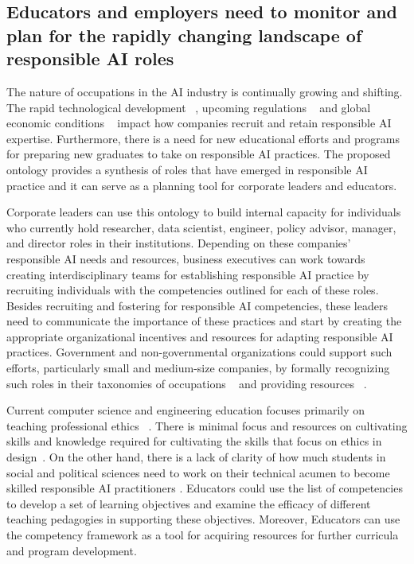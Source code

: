 \documentclass[sigconf]{acmart}
\begin{document}
\subsection{Educators and employers need to monitor and plan for the rapidly changing landscape of responsible AI roles}

The nature of occupations in the AI industry is continually growing and shifting. The rapid technological development ~\cite{Meek2016-wz,mit_2021-dg}, upcoming regulations ~\cite{aida-euai} and global economic conditions ~\cite{Goldman2022-ip,Knight2022-ym} impact how companies recruit and retain responsible AI expertise. Furthermore, there is a need for new educational efforts and programs for preparing new graduates to take on responsible AI practices. The proposed ontology provides a synthesis of roles that have emerged in responsible AI practice and it can serve as a planning tool for corporate leaders and educators. %

Corporate leaders can use this ontology to build internal capacity for individuals who currently hold researcher, data scientist, engineer, policy advisor, manager, and director roles in their institutions. Depending on these companies' responsible AI needs and resources, business executives can work towards creating interdisciplinary teams for establishing responsible AI practice by recruiting individuals with the competencies outlined for each of these roles. Besides recruiting and fostering for responsible AI competencies, these leaders need to communicate the importance of these practices and start by creating the appropriate organizational incentives and resources for adapting responsible AI practices. Government and non-governmental organizations could support such efforts, particularly small and medium-size companies, by formally recognizing such roles in their taxonomies of occupations ~\cite{Administration,EuropeanCommission2022} and providing resources ~\cite{Bessen2022-gy}. 

Current computer science and engineering education focuses primarily on teaching professional ethics ~\cite{Peterson2023-xa}. There is minimal focus and resources on cultivating skills and knowledge required for cultivating the skills that focus on ethics in design~\cite{Garrett2020-dw}. On the other hand, there is a lack of clarity of how much students in social and political sciences need to work on their technical acumen to become skilled responsible AI practitioners \cite{Raji2021}. Educators could use the list of competencies to develop a set of learning objectives and examine the efficacy of different teaching pedagogies in supporting these objectives. Moreover, Educators can use the competency framework as a tool for acquiring resources for further curricula and program development. 
\end{document}
